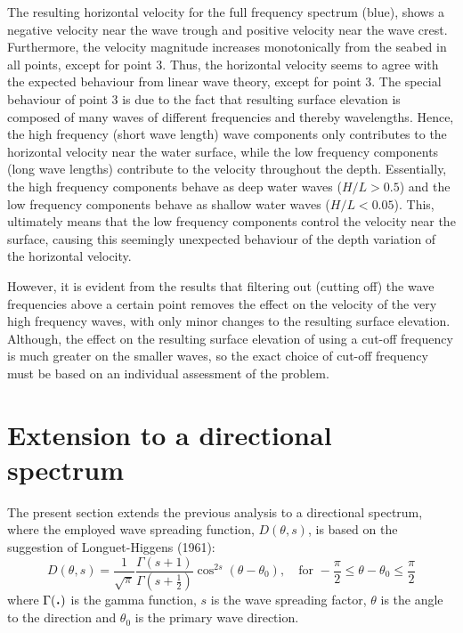 The resulting horizontal velocity for the full frequency spectrum (blue), shows a negative velocity near the wave trough and positive velocity near the wave crest. Furthermore, the velocity magnitude increases monotonically from the seabed in all points, except for point 3. Thus, the horizontal velocity seems to agree with the expected behaviour from linear wave theory, except for point 3. The special behaviour of point 3 is due to the fact that resulting surface elevation is composed of many waves of different frequencies and thereby wavelengths. Hence, the high frequency (short wave length) wave components only contributes to the horizontal velocity near the water surface, while the low frequency components (long wave lengths) contribute to the velocity throughout the depth. Essentially, the high frequency components behave as deep water waves ($H/L>0.5$) and the low frequency components behave as shallow water waves ($H/L<0.05$). This, ultimately means that the low frequency components control the velocity near the surface, causing this seemingly unexpected behaviour of the depth variation of the horizontal velocity.

However, it is evident from the results that filtering out (cutting off) the wave frequencies above a certain point removes the effect on the velocity of the very high frequency waves, with only minor changes to the resulting surface elevation. Although, the effect on the resulting surface elevation of using a cut-off frequency is much greater on the smaller waves, so the exact choice of cut-off frequency must be based on an individual assessment of the problem.

\vspace{15mm}
{\let\clearpage\relax \chapter{Extension to a directional spectrum}}
The present section extends the previous analysis to a directional spectrum, where the employed wave spreading function, $D(\theta,s)$, is based on the suggestion of Longuet-Higgens (1961):
\begin{equation}
    D(\theta,s) = \frac{1}{\sqrt{\pi}}\frac{\Gamma(s+1)}{\Gamma(s+\frac{1}{2})}\cos^{2s}{(\theta-\theta_0)}, \quad \text{for } -\frac{\pi}{2}\leq \theta - \theta_0 \leq \frac{\pi}{2}
\end{equation}
where $\Gamma(\text{\scalebox{0.5}{\textbullet}})$ is the gamma function, $s$ is the wave spreading factor, $\theta$ is the angle to the direction and $\theta_0$ is the primary wave direction.
